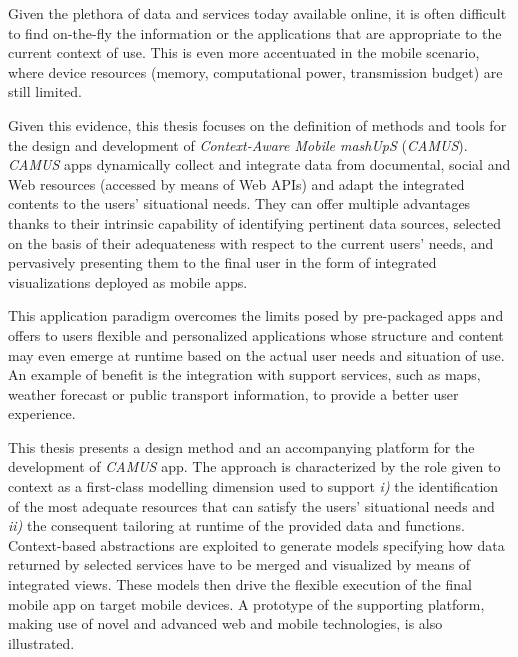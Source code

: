 %

Given the plethora of data and services today available online, it is often difficult to find on-the-fly the information or the applications that are appropriate to the current context of use. This is even more accentuated in the mobile scenario, where device resources (memory, computational power, transmission budget) are still limited. 

Given this evidence, this thesis focuses on the definition of methods and tools for the design and development of \emph{Context-Aware Mobile mashUpS} (\emph{CAMUS}). \emph{CAMUS} apps dynamically collect and integrate data from documental, social and Web resources (accessed by means of Web APIs) and adapt the integrated contents to the users’ situational needs. They can offer multiple advantages thanks to their intrinsic capability of identifying pertinent data sources, selected on the basis of their adequateness with respect to the current users’ needs, and pervasively presenting them to the final user in the form of integrated visualizations deployed as mobile apps.

This application paradigm overcomes the limits posed by pre-packaged apps and offers to users flexible and personalized applications whose structure and content may even emerge at runtime based on the actual user needs and situation of use. An example of benefit is the integration with support services, such as maps, weather forecast or public transport information, to provide a better user experience.

This thesis presents a design method and an accompanying platform for the development of \emph{CAMUS} app. The approach is characterized by the role given to context as a first-class modelling dimension used to support \emph{i)} the identification of the most adequate resources that can satisfy the users' situational needs and \emph{ii)} the consequent tailoring at runtime of the provided data and functions. Context-based abstractions are exploited to generate models specifying how data returned by selected services have to be merged and visualized by means of integrated views. These models then drive the flexible execution of the final mobile app on target mobile devices. A prototype of the supporting platform, making use of novel and advanced web and mobile technologies, is also illustrated.

%
